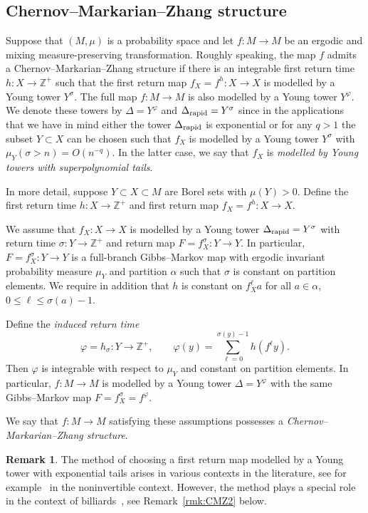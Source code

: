 \documentclass[10pt]{amsart}
\theoremstyle{definition}\newtheorem{defi}[theo]{Definition}\newtheorem{rema}[theo]{Remark}\newtheorem{exam}[theo]{Example}\newtheorem{exem}[theo]{Example}\newtheorem{nota}[theo]{Notation}
\newcommand{\Z}{\mathbb{Z}}
\newcommand{\DE}{\Delta_{\rm rapid}}
\begin{document}
\subsection{Chernov--Markarian--Zhang structure}
Suppose that $(M,\mu)$ is a probability space and let $f:M\to M$ be an ergodic and mixing measure-preserving transformation. Roughly speaking, the map $f$ admits a Chernov--Markarian--Zhang structure if there is an integrable first return time $h:X\to\Z^+$ such that the first return map $f_X=f^h:X\to X$ is modelled by a Young tower $Y^\sigma$. The full map $f:M\to M$ is also modelled by a Young tower $Y^\varphi$. We denote these towers by $\Delta=Y^\varphi$ and $\DE=Y^\sigma$ since in the applications that we have in mind either the tower $\DE$ is exponential or for any $q>1$ the subset $Y\subset X$ can be chosen such that $f_X$ is modelled by a Young tower $Y^\sigma$ with $\mu_Y(\sigma>n)=O(n^{-q})$. In the latter case, we say that $f_X$ is \emph{modelled by Young towers with superpolynomial tails}.

In more detail, suppose $Y\subset X\subset M$ are Borel sets with $\mu(Y)>0$. Define the first return time $h:X\to\Z^+$ and first return map $f_X=f^h:X\to X$.

We assume that $f_X:X\to X$ is modelled by a Young tower $\DE=Y^\sigma$ with return time $\sigma:Y\to\Z^+$ and return map $F=f_X^\sigma:Y\to Y$. In particular, $F=f_X^\sigma:Y\to Y$ is a full-branch Gibbs--Markov map with ergodic invariant probability measure $\mu_Y$ and partition $\alpha$ such that $\sigma$ is constant on partition elements. We require in addition that $h$ is constant on $f_X^\ell a$ for all $a\in\alpha$, $0\le\ell\le\sigma(a)-1$.

Define the \emph{induced return time}
\begin{equation}\label{eq:induce}
 \varphi=h_\sigma:Y\to\Z^+, \qquad
\varphi(y)=\sum_{\ell=0}^{\sigma(y)-1}h(f^\ell y).
\end{equation}
Then $\varphi$ is integrable with respect to $\mu_Y$ and constant on partition elements. In particular, $f:M\to M$ is modelled by a Young tower $\Delta=Y^\varphi$ with the same Gibbs--Markov map $F=f_X^\sigma=f^\varphi$.

We say that $f:M\to M$ satisfying these assumptions possesses a \emph{Chernov--Markarian--Zhang structure}.

\begin{rema}\label{rmk:CMZ}
The method of choosing a first return map modelled by a Young tower with exponential tails arises in various contexts in the literature, see for example~\cite{BruinLuzzattoStrien03,BruinTerhesiu18} in the noninvertible context. However, the method plays a special role in the context of billiards~\cite{ChernovZhang05,Markarian04}, see Remark~\ref{rmk:CMZ2} below.
\end{rema}
\end{document}
